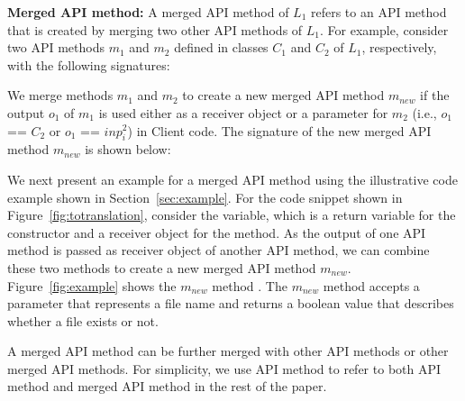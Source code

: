 \textbf{Merged API method:} A merged API method of $L_1$ refers to
an API method that is created by merging two other API methods of
$L_1$. For example, consider two API methods $m_1$ and $m_2$ defined
in classes $C_1$ and $C_2$ of $L_1$, respectively, with the
following signatures:



We merge methods $m_1$ and $m_2$ to create a new merged API method $m_{new}$ if the
output $o_1$ of $m_1$ is used either as a receiver object or a
parameter for $m_2$ (i.e., $o_1$ == $C_2$ or $o_1$ == $inp_i^2$)
in Client code. The signature of the new merged API method $m_{new}$ is
shown below:


We next present an example for a merged API method using the
illustrative code example shown in Section~\ref{sec:example}. For
the code snippet shown in Figure~\ref{fig:totranslation}, consider
the  variable, which is a return variable for the
constructor and a receiver object for the  method.
As the output of one API method is passed as receiver object of
another API method, we can combine these two methods to create a new
merged API method $m_{new}$. Figure~\ref{fig:example} shows the
$m_{new}$ method . The $m_{new}$
method accepts a  parameter that represents a file
name and returns a boolean value that describes whether a file
exists or not.

A merged API method can be further merged with other API methods or
other merged API methods. For simplicity, we use API method to refer
to both API method and merged API method in the rest of the paper.
